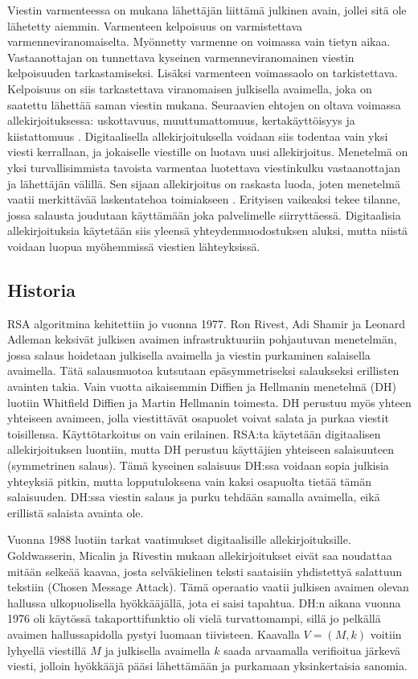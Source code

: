 \documentclass[finnish]{tktltiki2}
\theoremstyle{definition}
\theoremstyle{remark}
\begin{document}
Viestin varmenteessa on mukana lähettäjän liittämä julkinen avain, jollei sitä ole lähetetty aiemmin. Varmenteen kelpoisuus on varmistettava varmenneviranomaiselta. Myönnetty varmenne on voimassa vain tietyn aikaa. Vastaanottajan on tunnettava kyseinen varmenneviranomainen viestin kelpoisuuden tarkastamiseksi. Lisäksi varmenteen voimassaolo on tarkistettava. Kelpoisuus on siis tarkastettava viranomaisen julkisella avaimella, joka on saatettu lähettää saman viestin mukana. Seuraavien ehtojen on oltava voimassa allekirjoituksessa: uskottavuus, muuttumattomuus, kertakäyttöisyys ja kiistattomuus \cite{e-c}. Digitaalisella allekirjoituksella voidaan siis todentaa vain yksi viesti kerrallaan, ja jokaiselle viestille on luotava uusi allekirjoitus. Menetelmä on yksi turvallisimmista tavoista varmentaa luotettava viestinkulku vastaanottajan ja lähettäjän välillä. Sen sijaan allekirjoitus on raskasta luoda, joten menetelmä vaatii merkittävää laskentatehoa toimiakseen \cite{proxy}. Erityisen vaikeaksi tekee tilanne, jossa salausta joudutaan käyttämään joka palvelimelle siirryttäessä. Digitaalisia allekirjoituksia käytetään siis yleensä yhteydenmuodostuksen aluksi, mutta niistä voidaan luopua myöhemmissä viestien lähteyksissä.

\subsection{Historia}

RSA algoritmina kehitettiin jo vuonna 1977. Ron Rivest, Adi Shamir ja Leonard Adleman keksivät julkisen avaimen infrastruktuuriin pohjautuvan menetelmän, jossa salaus hoidetaan julkisella avaimella ja viestin purkaminen salaisella avaimella. Tätä salausmuotoa kutsutaan epäsymmetriseksi salaukseksi erillisten avainten takia. Vain vuotta aikaisemmin Diffien ja Hellmanin menetelmä (DH) luotiin Whitfield Diffien ja Martin Hellmanin toimesta. DH perustuu myös yhteen yhteiseen avaimeen, jolla viestittävät osapuolet voivat salata ja purkaa viestit toisillensa. Käyttötarkoitus on vain erilainen. RSA:ta käytetään digitaalisen allekirjoituksen luontiin, mutta DH perustuu käyttäjien yhteiseen salaisuuteen (symmetrinen salaus). Tämä kyseinen salaisuus DH:ssa voidaan sopia julkisia yhteyksiä pitkin, mutta lopputuloksena vain kaksi osapuolta tietää tämän salaisuuden. DH:ssa viestin salaus ja purku tehdään samalla avaimella, eikä erillistä salaista avainta ole.

Vuonna 1988 luotiin tarkat vaatimukset digitaalisille allekirjoituksille. Goldwasserin, Micalin ja Rivestin \cite{siam} mukaan allekirjoitukset eivät saa noudattaa mitään selkeää kaavaa, josta selväkielinen teksti saataisiin yhdistettyä salattuun tekstiin (Chosen Message Attack). Tämä operaatio vaatii julkisen avaimen olevan hallussa ulkopuolisella hyökkääjällä, jota ei saisi tapahtua. DH:n aikana vuonna 1976 oli käytössä takaporttifunktio oli vielä turvattomampi, sillä jo pelkällä avaimen hallussapidolla pystyi luomaan tiivisteen. Kaavalla $V =(M,k)$ voitiin lyhyellä viestillä $M$ ja julkisella avaimella $k$ saada arvaamalla verifioitua järkevä viesti, jolloin hyökkääjä pääsi lähettämään ja purkamaan yksinkertaisia sanomia.  
\end{document}
